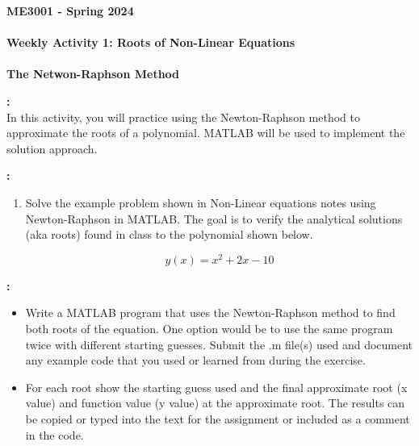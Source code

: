 \documentclass[11pt]{article}
\newcommand{\NUM}{1}
\begin{document}
	\textbf{\LARGE ME3001 - Spring 2024} \\\\
	\textbf{\LARGE Weekly Activity \NUM:  Roots of Non-Linear Equations}\\\\
	\textbf{\LARGE The Netwon-Raphson Method} \\
	
	\begin{description}
        \vspace{5mm}
    \item [\textbf{ \Large Overview}] \textbf{ \Large :}\\

    In this activity, you will practice using the Newton-Raphson method to approximate the roots of a polynomial. MATLAB will be used to implement the solution approach.

    \item [\textbf{ \large Assignment}] \textbf{ \Large :}\\

  \begin{enumerate}

    \item Solve the example problem shown in Non-Linear equations notes using Newton-Raphson in MATLAB. The goal is to verify the analytical solutions (aka roots) found in class to the polynomial shown below. 

    \[y(x) = x^2 +2x - 10\]

  \end{enumerate}

  \item [\textbf{ \large Deliverables}] \textbf{ \Large :}\\
  \begin{itemize} 
   
    \item Write a MATLAB program that uses the Newton-Raphson method to find both roots of the equation. One option would be to use the same program twice with different starting guesses. Submit the .m file(s) used and document any example code that you used or learned from during the exercise.
\vspace*{3mm}
    \item For each root show the starting guess used and the final approximate root (x value) and function value (y value) at the approximate root. The results can be copied or typed into the text for the assignment or included as a comment in the code.

  \end{itemize}
  \end{description}
 
\end{document}
